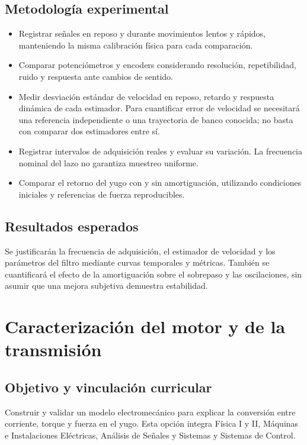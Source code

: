 \documentclass[11pt,a4paper]{article}
\begin{document}
\subsection{Metodología experimental}
\begin{itemize}
    \item Registrar señales en reposo y durante movimientos lentos y rápidos,
    manteniendo la misma calibración física para cada comparación.
    \item Comparar potenciómetros y encoders considerando resolución,
    repetibilidad, ruido y respuesta ante cambios de sentido.
    \item Medir desviación estándar de velocidad en reposo, retardo y
    respuesta dinámica de cada estimador. Para cuantificar error de
    velocidad se necesitará una referencia independiente o una trayectoria
    de banco conocida; no basta con comparar dos estimadores entre sí.
    \item Registrar intervalos de adquisición reales y evaluar su variación.
    La frecuencia nominal del lazo no garantiza muestreo uniforme.
    \item Comparar el retorno del yugo con y sin amortiguación, utilizando
    condiciones iniciales y referencias de fuerza reproducibles.
\end{itemize}

\subsection{Resultados esperados}
Se justificarán la frecuencia de adquisición, el estimador de velocidad y
los parámetros del filtro mediante curvas temporales y métricas. También
se cuantificará el efecto de la amortiguación sobre el sobrepaso y las
oscilaciones, sin asumir que una mejora subjetiva demuestra estabilidad.

\section{Caracterización del motor y de la transmisión}
\label{sec:modelo}

\subsection{Objetivo y vinculación curricular}
Construir y validar un modelo electromecánico para explicar la conversión
entre corriente, torque y fuerza en el yugo. Esta opción integra Física I
y II, Máquinas e Instalaciones Eléctricas, Análisis de Señales y Sistemas
y Sistemas de Control.
\end{document}

